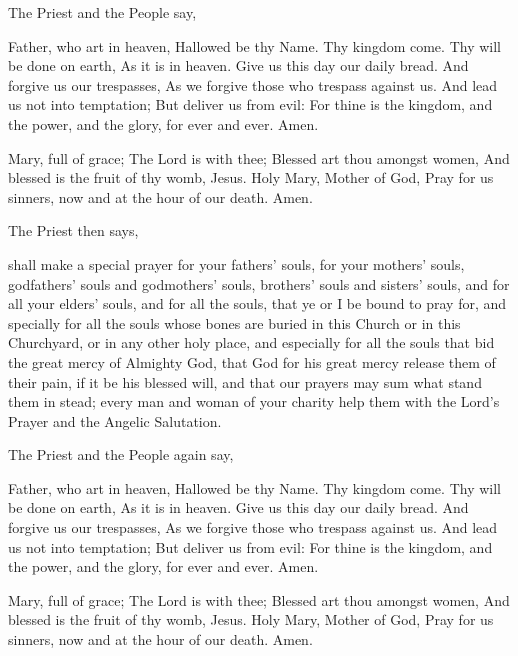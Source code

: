 \begin{rubric}
    The Priest and the People say,
\end{rubric}

 Father, who art in heaven, Hallowed be thy Name. Thy kingdom come. Thy will be done on earth, As it is in heaven. Give us this day our daily bread. And forgive us our trespasses, As we forgive those who trespass against us. And lead us not into temptation; But deliver us from evil: For thine is the kingdom, and the power, and the glory, for ever and ever. Amen.
\par\noindent
{} Mary, full of grace; The Lord is with thee; Blessed art thou amongst women, And blessed is the fruit of thy womb, Jesus. Holy Mary, Mother of God, Pray for us sinners, now and at the hour of our death. Amen.
\begin{rubric}
    The Priest then says,
\end{rubric}
 shall make a special prayer for your fathers' souls, for your mothers' souls, godfathers' souls and godmothers' souls, brothers' souls and sisters' souls, and for all your elders' souls, and for all the souls, that ye or I be bound to pray for, and specially for all the souls whose bones are buried in this Church or in this Churchyard, or in any other holy place, and especially for all the souls that bid the great mercy of Almighty God, that God for his great mercy release them of their pain, if it be his blessed will, and that our prayers may sum what stand them in stead; every man and woman of your charity help them with the Lord's Prayer and the Angelic Salutation.
\begin{rubric}
    The Priest and the People again say,
\end{rubric}
 Father, who art in heaven, Hallowed be thy Name. Thy kingdom come. Thy will be done on earth, As it is in heaven. Give us this day our daily bread. And forgive us our trespasses, As we forgive those who trespass against us. And lead us not into temptation; But deliver us from evil: For thine is the kingdom, and the power, and the glory, for ever and ever. Amen.
\par\noindent
{} Mary, full of grace; The Lord is with thee; Blessed art thou amongst women, And blessed is the fruit of thy womb, Jesus. Holy Mary, Mother of God, Pray for us sinners, now and at the hour of our death. Amen.

